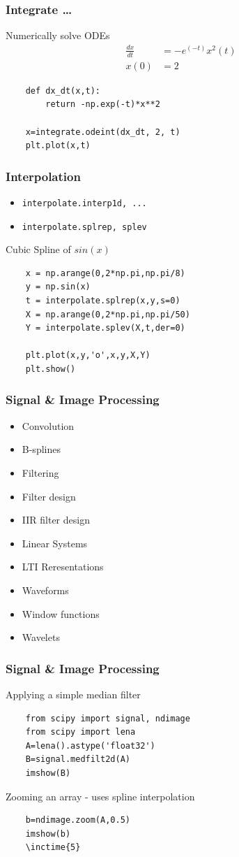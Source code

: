 \documentclass[14pt,compress]{beamer}
\newcounter{time}
\newcommand{\inctime}[1]{\addtocounter{time}{#1}{\tiny \thetime\ m}}
\newcommand{\typ}[1]{\lstinline{#1}}
\begin{document}
\begin{frame}[fragile]
  \frametitle{Integrate \ldots}
  Numerically solve ODEs\\
  \begin{align*}
  \frac{dx}{dt}&=-e^{(-t)}x^2(t)\\ 
           x(0)&=2    
  \end{align*}
  \begin{lstlisting}
    def dx_dt(x,t):
        return -np.exp(-t)*x**2

    x=integrate.odeint(dx_dt, 2, t)
    plt.plot(x,t)
  \end{lstlisting}
\inctime{10}
\end{frame}

\begin{frame}[fragile]
  \frametitle{Interpolation}
  \begin{itemize}
    \item \typ{interpolate.interp1d, ...}
    \item \typ{interpolate.splrep, splev}
  \end{itemize}
  Cubic Spline of $sin(x)$
  \begin{lstlisting}
    x = np.arange(0,2*np.pi,np.pi/8)
    y = np.sin(x)
    t = interpolate.splrep(x,y,s=0)
    X = np.arange(0,2*np.pi,np.pi/50)
    Y = interpolate.splev(X,t,der=0)

    plt.plot(x,y,'o',x,y,X,Y)
    plt.show()
  \end{lstlisting}
\inctime{10}
\end{frame}

\begin{frame}[fragile]
  \frametitle{Signal \& Image Processing}
    \begin{itemize}
     \item Convolution
     \item B-splines
     \item Filtering
     \item Filter design
     \item IIR filter design
     \item Linear Systems
     \item LTI Reresentations
     \item Waveforms
     \item Window functions
     \item Wavelets
    \end{itemize}
\end{frame}

\begin{frame}[fragile]
  \frametitle{Signal \& Image Processing}
  Applying a simple median filter
  \begin{lstlisting}
    from scipy import signal, ndimage
    from scipy import lena
    A=lena().astype('float32')
    B=signal.medfilt2d(A)
    imshow(B)
  \end{lstlisting}
  Zooming an array - uses spline interpolation
  \begin{lstlisting}
    b=ndimage.zoom(A,0.5)
    imshow(b)
    \inctime{5}
  \end{lstlisting}

\end{frame}
\end{document}
